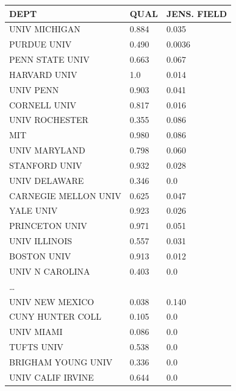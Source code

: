\begin{table}[!ht]
    \centering
    {\footnotesize
    \begin{tabular}{lll}
        \hline
        DEPT                     & QUAL  & JENS. FIELD \\ \hline \hline
        UNIV MICHIGAN            & 0.884 & 0.035       \\
        PURDUE UNIV              & 0.490 & 0.0036      \\
        PENN STATE UNIV          & 0.663 & 0.067       \\
        HARVARD UNIV             & 1.0   & 0.014       \\
        UNIV PENN                & 0.903 & 0.041       \\
        CORNELL UNIV             & 0.817 & 0.016       \\
        UNIV ROCHESTER           & 0.355 & 0.086       \\
        MIT                      & 0.980 & 0.086       \\
        UNIV MARYLAND            & 0.798 & 0.060       \\
        STANFORD UNIV            & 0.932 & 0.028       \\
        UNIV DELAWARE            & 0.346 & 0.0         \\
        CARNEGIE MELLON UNIV     & 0.625 & 0.047       \\
        YALE UNIV                & 0.923 & 0.026       \\
        PRINCETON UNIV           & 0.971 & 0.051       \\
        UNIV ILLINOIS            & 0.557 & 0.031       \\
        BOSTON UNIV              & 0.913 & 0.012       \\
        UNIV N CAROLINA          & 0.403 & 0.0         \\
        \ldots                   &       &             \\
        UNIV NEW MEXICO          & 0.038 & 0.140       \\
        CUNY HUNTER COLL         & 0.105 & 0.0         \\
        UNIV MIAMI               & 0.086 & 0.0         \\
        TUFTS UNIV               & 0.538 & 0.0         \\
        BRIGHAM YOUNG UNIV       & 0.336 & 0.0         \\
        UNIV CALIF IRVINE        & 0.644 & 0.0         \\

\end{tabular}}
\end{table}

